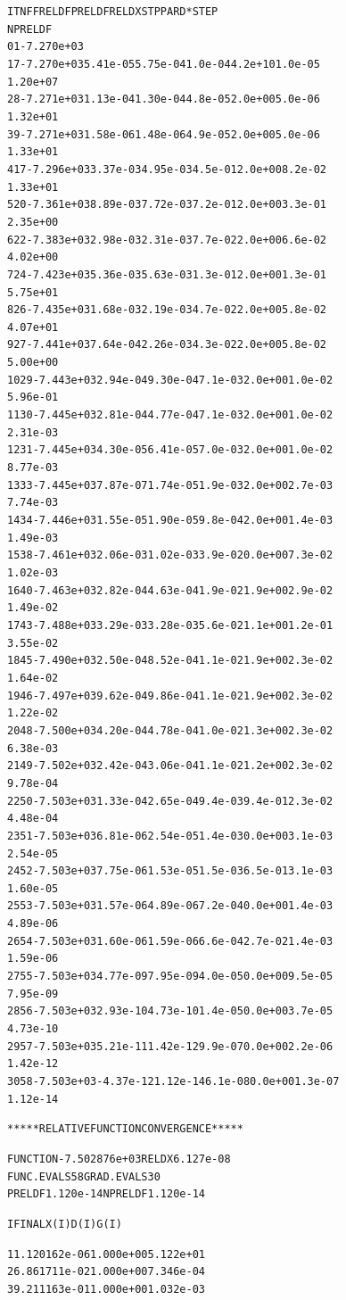 \documentclass[letterpaper,10pt,english]{/Users/edwsurewin/anaconda/lib/python2.7/site-packages/sphinx/texinputs/sphinxhowto}
\newenvironment{InvisibleVerbatim}
        {\begin{mdframed}[leftmargin=0.1\linewidth,innerleftmargin=3pt,innerrightmargin=3pt, userdefinedwidth=1\linewidth, linewidth=0pt, linecolor=white, usetwoside=false]}
        {\end{mdframed}}
\begin{document}
\begin{InvisibleVerbatim}
\begin{alltt}
    IT   NF      F         RELDF    PRELDF    RELDX   STPPAR   D*STEP
NPRELDF
     0    1 -7.270e+03
     1    7 -7.270e+03  5.41e-05  5.75e-04  1.0e-04  4.2e+10  1.0e-05
1.20e+07
     2    8 -7.271e+03  1.13e-04  1.30e-04  4.8e-05  2.0e+00  5.0e-06
1.32e+01
     3    9 -7.271e+03  1.58e-06  1.48e-06  4.9e-05  2.0e+00  5.0e-06
1.33e+01
     4   17 -7.296e+03  3.37e-03  4.95e-03  4.5e-01  2.0e+00  8.2e-02
1.33e+01
     5   20 -7.361e+03  8.89e-03  7.72e-03  7.2e-01  2.0e+00  3.3e-01
2.35e+00
     6   22 -7.383e+03  2.98e-03  2.31e-03  7.7e-02  2.0e+00  6.6e-02
4.02e+00
     7   24 -7.423e+03  5.36e-03  5.63e-03  1.3e-01  2.0e+00  1.3e-01
5.75e+01
     8   26 -7.435e+03  1.68e-03  2.19e-03  4.7e-02  2.0e+00  5.8e-02
4.07e+01
     9   27 -7.441e+03  7.64e-04  2.26e-03  4.3e-02  2.0e+00  5.8e-02
5.00e+00
    10   29 -7.443e+03  2.94e-04  9.30e-04  7.1e-03  2.0e+00  1.0e-02
5.96e-01
    11   30 -7.445e+03  2.81e-04  4.77e-04  7.1e-03  2.0e+00  1.0e-02
2.31e-03
    12   31 -7.445e+03  4.30e-05  6.41e-05  7.0e-03  2.0e+00  1.0e-02
8.77e-03
    13   33 -7.445e+03  7.87e-07  1.74e-05  1.9e-03  2.0e+00  2.7e-03
7.74e-03
    14   34 -7.446e+03  1.55e-05  1.90e-05  9.8e-04  2.0e+00  1.4e-03
1.49e-03
    15   38 -7.461e+03  2.06e-03  1.02e-03  3.9e-02  0.0e+00  7.3e-02
1.02e-03
    16   40 -7.463e+03  2.82e-04  4.63e-04  1.9e-02  1.9e+00  2.9e-02
1.49e-02
    17   43 -7.488e+03  3.29e-03  3.28e-03  5.6e-02  1.1e+00  1.2e-01
3.55e-02
    18   45 -7.490e+03  2.50e-04  8.52e-04  1.1e-02  1.9e+00  2.3e-02
1.64e-02
    19   46 -7.497e+03  9.62e-04  9.86e-04  1.1e-02  1.9e+00  2.3e-02
1.22e-02
    20   48 -7.500e+03  4.20e-04  4.78e-04  1.0e-02  1.3e+00  2.3e-02
6.38e-03
    21   49 -7.502e+03  2.42e-04  3.06e-04  1.1e-02  1.2e+00  2.3e-02
9.78e-04
    22   50 -7.503e+03  1.33e-04  2.65e-04  9.4e-03  9.4e-01  2.3e-02
4.48e-04
    23   51 -7.503e+03  6.81e-06  2.54e-05  1.4e-03  0.0e+00  3.1e-03
2.54e-05
    24   52 -7.503e+03  7.75e-06  1.53e-05  1.5e-03  6.5e-01  3.1e-03
1.60e-05
    25   53 -7.503e+03  1.57e-06  4.89e-06  7.2e-04  0.0e+00  1.4e-03
4.89e-06
    26   54 -7.503e+03  1.60e-06  1.59e-06  6.6e-04  2.7e-02  1.4e-03
1.59e-06
    27   55 -7.503e+03  4.77e-09  7.95e-09  4.0e-05  0.0e+00  9.5e-05
7.95e-09
    28   56 -7.503e+03  2.93e-10  4.73e-10  1.4e-05  0.0e+00  3.7e-05
4.73e-10
    29   57 -7.503e+03  5.21e-11  1.42e-12  9.9e-07  0.0e+00  2.2e-06
1.42e-12
    30   58 -7.503e+03 -4.37e-12  1.12e-14  6.1e-08  0.0e+00  1.3e-07
1.12e-14

 ***** RELATIVE FUNCTION CONVERGENCE *****

 FUNCTION    -7.502876e+03   RELDX        6.127e-08
 FUNC. EVALS      58         GRAD. EVALS      30
 PRELDF       1.120e-14      NPRELDF      1.120e-14

     I      FINAL X(I)        D(I)          G(I)

     1    1.120162e-06     1.000e+00     5.122e+01
     2    6.861711e-02     1.000e+00     7.346e-04
     3    9.211163e-01     1.000e+00     1.032e-03

\end{alltt}

            \end{InvisibleVerbatim}
            
\end{document}

